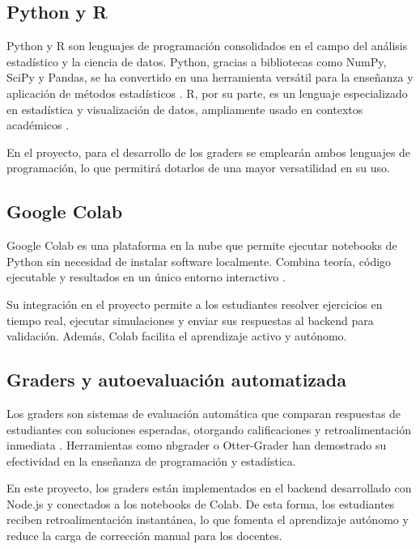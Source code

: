 \documentclass[letter,oneside,12pt,spanish]{report}
\begin{document}
\subsection{Python y R}

Python y R son lenguajes de programación consolidados en el campo del análisis estadístico y la ciencia de datos. Python, gracias a bibliotecas como NumPy, SciPy y Pandas, se ha convertido en una herramienta versátil para la enseñanza y aplicación de métodos estadísticos \parencite{mckinney2017}. R, por su parte, es un lenguaje especializado en estadística y visualización de datos, ampliamente usado en contextos académicos \parencite{rcoreteam2023}.

En el proyecto, para el desarrollo de los graders se emplearán ambos lenguajes de programación, lo que permitirá dotarlos de una mayor versatilidad en su uso.

\subsection{Google Colab}

Google Colab es una plataforma en la nube que permite ejecutar notebooks de Python sin necesidad de instalar software localmente. Combina teoría, código ejecutable y resultados en un único entorno interactivo \parencite{bisong2019}.

Su integración en el proyecto permite a los estudiantes resolver ejercicios en tiempo real, ejecutar simulaciones y enviar sus respuestas al backend para validación. Además, Colab facilita el aprendizaje activo y autónomo.

\subsection{Graders y autoevaluación automatizada}

Los graders son sistemas de evaluación automática que comparan respuestas de estudiantes con soluciones esperadas, otorgando calificaciones y retroalimentación inmediata \parencite{kurnia2001}. Herramientas como nbgrader o Otter-Grader han demostrado su efectividad en la enseñanza de programación y estadística.

En este proyecto, los graders están implementados en el backend desarrollado con Node.js y conectados a los notebooks de Colab. De esta forma, los estudiantes reciben retroalimentación instantánea, lo que fomenta el aprendizaje autónomo y reduce la carga de corrección manual para los docentes.
\end{document}
